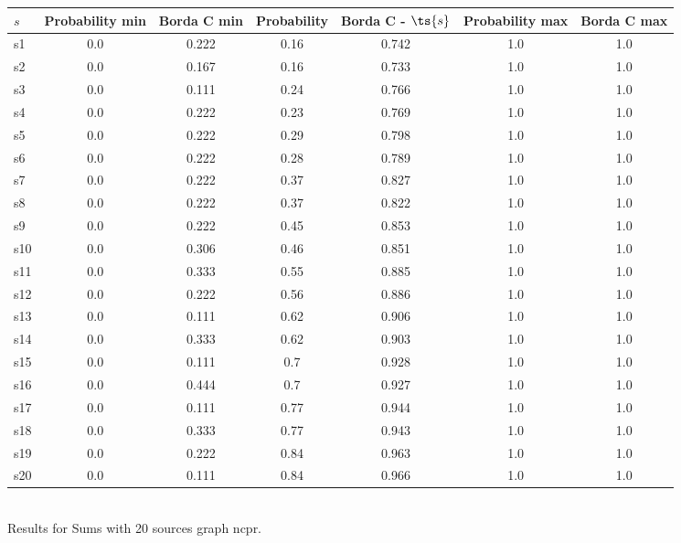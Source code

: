 \documentclass{article}
\begin{document}
\noindent\begin{tabular}{|l|c|c|c|c|c|c|}
\hline
$s$& Probability min & Borda C min & Probability & Borda C - $\ts{s}$ & Probability max & Borda C max\\
\hline
s1 &0.0 & 0.222 & 0.16 & 0.742 & 1.0 & 1.0\\
\hline
s2 &0.0 & 0.167 & 0.16 & 0.733 & 1.0 & 1.0\\
\hline
s3 &0.0 & 0.111 & 0.24 & 0.766 & 1.0 & 1.0\\
\hline
s4 &0.0 & 0.222 & 0.23 & 0.769 & 1.0 & 1.0\\
\hline
s5 &0.0 & 0.222 & 0.29 & 0.798 & 1.0 & 1.0\\
\hline
s6 &0.0 & 0.222 & 0.28 & 0.789 & 1.0 & 1.0\\
\hline
s7 &0.0 & 0.222 & 0.37 & 0.827 & 1.0 & 1.0\\
\hline
s8 &0.0 & 0.222 & 0.37 & 0.822 & 1.0 & 1.0\\
\hline
s9 &0.0 & 0.222 & 0.45 & 0.853 & 1.0 & 1.0\\
\hline
s10 &0.0 & 0.306 & 0.46 & 0.851 & 1.0 & 1.0\\
\hline
s11 &0.0 & 0.333 & 0.55 & 0.885 & 1.0 & 1.0\\
\hline
s12 &0.0 & 0.222 & 0.56 & 0.886 & 1.0 & 1.0\\
\hline
s13 &0.0 & 0.111 & 0.62 & 0.906 & 1.0 & 1.0\\
\hline
s14 &0.0 & 0.333 & 0.62 & 0.903 & 1.0 & 1.0\\
\hline
s15 &0.0 & 0.111 & 0.7 & 0.928 & 1.0 & 1.0\\
\hline
s16 &0.0 & 0.444 & 0.7 & 0.927 & 1.0 & 1.0\\
\hline
s17 &0.0 & 0.111 & 0.77 & 0.944 & 1.0 & 1.0\\
\hline
s18 &0.0 & 0.333 & 0.77 & 0.943 & 1.0 & 1.0\\
\hline
s19 &0.0 & 0.222 & 0.84 & 0.963 & 1.0 & 1.0\\
\hline
s20 &0.0 & 0.111 & 0.84 & 0.966 & 1.0 & 1.0\\
\hline
\end{tabular}\\

\noindent Results for Sums with 20 sources graph ncpr.
\end{document}
